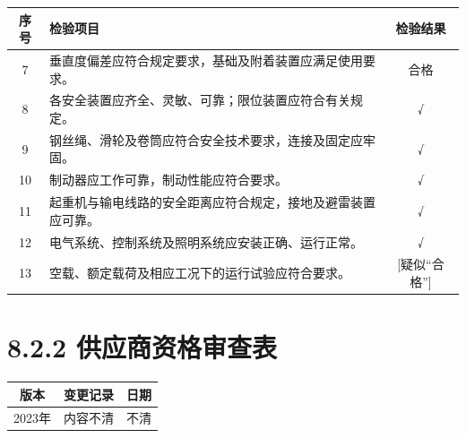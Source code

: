 \documentclass[UTF8,10pt,a4paper,fontset=fandol]{ctexart}
\newcommand{\fieldvalue}[1]{#1}
\newcommand{\handwritten}[1]{#1}
\begin{document}
\vspace{0.5em}

\noindent
\begin{tabularx}{\textwidth}{|c|X|c|}
\hline
序号 & 检验项目 & 检验结果 \\
\hline
7 &
垂直度偏差应符合规定要求，基础及附着装置应满足使用要求。 &
\fieldvalue{\handwritten{合格}} \\
\hline
8 &
各安全装置应齐全、灵敏、可靠；限位装置应符合有关规定。 &
\fieldvalue{\handwritten{√}} \\
\hline
9 &
钢丝绳、滑轮及卷筒应符合安全技术要求，连接及固定应牢固。 &
\fieldvalue{\handwritten{√}} \\
\hline
10 &
制动器应工作可靠，制动性能应符合要求。 &
\fieldvalue{\handwritten{√}} \\
\hline
11 &
起重机与输电线路的安全距离应符合规定，接地及避雷装置应可靠。 &
\fieldvalue{\handwritten{√}} \\
\hline
12 &
电气系统、控制系统及照明系统应安装正确、运行正常。 &
\fieldvalue{\handwritten{√}} \\
\hline
13 &
空载、额定载荷及相应工况下的运行试验应符合要求。 &
\fieldvalue{\handwritten{[疑似“合格”]}} \\
\hline
\end{tabularx}


\newpage

\section*{8.2.2 供应商资格审查表}

\begin{tabularx}{\textwidth}{|c|X|c|}
\hline
版本 & 变更记录 & 日期 \\
\hline
\fieldvalue{\handwritten{2023年}} &
\fieldvalue{\handwritten{内容不清}} &
\fieldvalue{\handwritten{不清}} \\
\hline
\end{tabularx}
\end{document}
